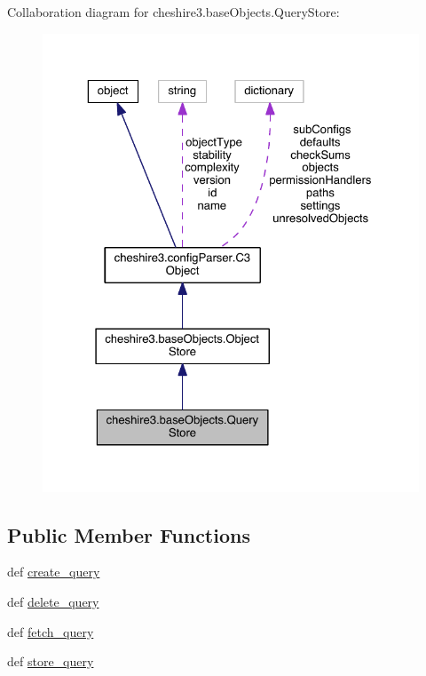 Collaboration diagram for cheshire3.\-base\-Objects.\-Query\-Store\-:
\nopagebreak
\begin{figure}[H]
\begin{center}
\leavevmode
\includegraphics[width=325pt]{classcheshire3_1_1base_objects_1_1_query_store__coll__graph}
\end{center}
\end{figure}
\subsection*{Public Member Functions}
\begin{DoxyCompactItemize}
\item 
def \hyperlink{classcheshire3_1_1base_objects_1_1_query_store_a169255ad346306d84fbaa359e9755a5d}{create\-\_\-query}
\item 
def \hyperlink{classcheshire3_1_1base_objects_1_1_query_store_aeea57a0b15f0d16dbb4d9481e010ccb3}{delete\-\_\-query}
\item 
def \hyperlink{classcheshire3_1_1base_objects_1_1_query_store_ab92e65704959f04084178b59b62a67d2}{fetch\-\_\-query}
\item 
def \hyperlink{classcheshire3_1_1base_objects_1_1_query_store_a5130144a0d375624cd83ebd452ff2fac}{store\-\_\-query}
\end{DoxyCompactItemize}

